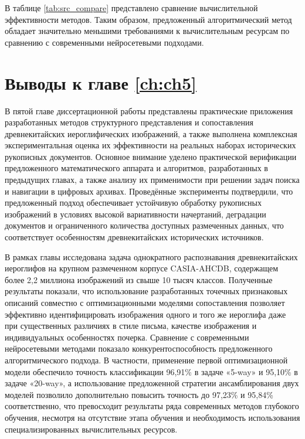 В таблице \cref{tab:src_compare} представлено сравнение вычислительной эффективности методов. Таким образом, предложенный алгоритмический метод обладает значительно меньшими требованиями к вычислительным ресурсам по сравнению с современными нейросетевыми подходами.

\section{Выводы к главе \cref{ch:ch5}}

В пятой главе диссертационной работы представлены практические приложения разработанных методов структурного представления и сопоставления древнекитайских иероглифических изображений, а также выполнена комплексная экспериментальная оценка их эффективности на реальных наборах исторических рукописных документов. Основное внимание уделено практической верификации предложенного математического аппарата и алгоритмов, разработанных в предыдущих главах, а также анализу их применимости при решении задач поиска и навигации в цифровых архивах. Проведённые эксперименты подтвердили, что предложенный подход обеспечивает устойчивую обработку рукописных изображений в условиях высокой вариативности начертаний, деградации документов и ограниченного количества доступных размеченных данных, что соответствует особенностям древнекитайских исторических источников.

В рамках главы исследована задача однократного распознавания древнекитайских иероглифов на крупном размеченном корпусе CASIA-AHCDB, содержащем более 2,2 миллиона изображений из свыше 10 тысяч классов. Полученные результаты показали, что использование разработанных точечных признаковых описаний совместно с оптимизационными моделями сопоставления позволяет эффективно идентифицировать изображения одного и того же иероглифа даже при существенных различиях в стиле письма, качестве изображения и индивидуальных особенностях почерка. Сравнение с современными нейросетевыми методами показало конкурентоспособность предложенного алгоритмического подхода. В частности, применение первой оптимизационной модели обеспечило точность классификации 96,91\% в задаче «5-way» и 95,10\% в задаче «20-way», а использование предложенной стратегии ансамблирования двух моделей позволило дополнительно повысить точность до 97,23\% и 95,84\% соответственно, что превосходит результаты ряда современных методов глубокого обучения, несмотря на отсутствие этапа обучения и необходимость использования специализированных вычислительных ресурсов.

